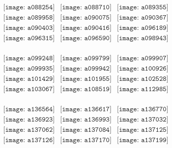 \documentclass{article}
\begin{document}
\begin{figure}[H]
 \begin{center}$
 \begin{array}{cccc}
\texttt{[image: a088254]}&\texttt{[image: a088710]}&\texttt{[image: a089355]}\\\texttt{[image: a089958]}&\texttt{[image: a090075]}&\texttt{[image: a090367]}\\\texttt{[image: a090403]}&\texttt{[image: a090416]}&\texttt{[image: a096189]}\\\texttt{[image: a096315]}&\texttt{[image: a096590]}&\texttt{[image: a098943]}\\
\end{array}$
\end{center}
\end{figure}

\begin{figure}[H]
 \begin{center}$
 \begin{array}{cccc}
\texttt{[image: a099248]}&\texttt{[image: a099799]}&\texttt{[image: a099907]}\\\texttt{[image: a099935]}&\texttt{[image: a099942]}&\texttt{[image: a100926]}\\\texttt{[image: a101429]}&\texttt{[image: a101955]}&\texttt{[image: a102528]}\\\texttt{[image: a103067]}&\texttt{[image: a108519]}&\texttt{[image: a112985]}\\
\end{array}$
\end{center}
\end{figure}

\begin{figure}[H]
 \begin{center}$
 \begin{array}{cccc}
\texttt{[image: a136564]}&\texttt{[image: a136617]}&\texttt{[image: a136770]}\\\texttt{[image: a136923]}&\texttt{[image: a136993]}&\texttt{[image: a137032]}\\\texttt{[image: a137062]}&\texttt{[image: a137084]}&\texttt{[image: a137125]}\\\texttt{[image: a137126]}&\texttt{[image: a137170]}&\texttt{[image: a137199]}\\
\end{array}$
\end{center}
\end{figure}
\end{document}
